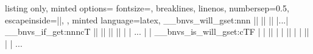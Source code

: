 \begin{tcblisting} {
  listing only,
  minted options={
    fontsize=\small,
    breaklines,
    linenos,
    numbersep=0.5\baselineskip,
    escapeinside=||,
  },
  minted language=latex,
}
\__bnvs_will_gset:nnn {||} {||} {||}
|...|
\__bnvs_if_get:nnncT {||} {||} {||} {||} {
| | ...
| | \__bnvs_is_will_gset:cTF
| |   {||}
| |   {||}
| |   {||}
| | ...
}
\end{tcblisting}
